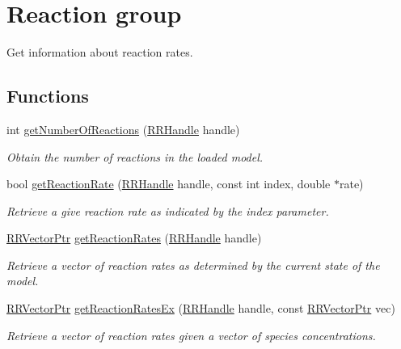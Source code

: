 \hypertarget{group__reaction}{\section{Reaction group}
\label{group__reaction}
}


Get information about reaction rates.  


\subsection*{Functions}
\begin{DoxyCompactItemize}
\item 
int \hyperlink{group__reaction_ga45a8bf0e5d7c9012222f0ad4c36e6731}{get\+Number\+Of\+Reactions} (\hyperlink{rrc__types_8h_a1d68f0592372208fa5a5f2799ea4b3ae}{R\+R\+Handle} handle)
\begin{DoxyCompactList}\small\item\em Obtain the number of reactions in the loaded model. \end{DoxyCompactList}\item 
bool \hyperlink{group__reaction_ga9e5d91c68214fd9642d3ffb9338cae19}{get\+Reaction\+Rate} (\hyperlink{rrc__types_8h_a1d68f0592372208fa5a5f2799ea4b3ae}{R\+R\+Handle} handle, const int index, double $\ast$rate)
\begin{DoxyCompactList}\small\item\em Retrieve a give reaction rate as indicated by the index parameter. \end{DoxyCompactList}\item 
\hyperlink{rrc__types_8h_a3be72d6006034fd349f753d2bf441bf7}{R\+R\+Vector\+Ptr} \hyperlink{group__reaction_gaa4b8c528a76898bbb78cfa41479dd085}{get\+Reaction\+Rates} (\hyperlink{rrc__types_8h_a1d68f0592372208fa5a5f2799ea4b3ae}{R\+R\+Handle} handle)
\begin{DoxyCompactList}\small\item\em Retrieve a vector of reaction rates as determined by the current state of the model. \end{DoxyCompactList}\item 
\hyperlink{rrc__types_8h_a3be72d6006034fd349f753d2bf441bf7}{R\+R\+Vector\+Ptr} \hyperlink{group__reaction_ga1dd7908ba77e177592587da9c21ed4f6}{get\+Reaction\+Rates\+Ex} (\hyperlink{rrc__types_8h_a1d68f0592372208fa5a5f2799ea4b3ae}{R\+R\+Handle} handle, const \hyperlink{rrc__types_8h_a3be72d6006034fd349f753d2bf441bf7}{R\+R\+Vector\+Ptr} vec)
\begin{DoxyCompactList}\small\item\em Retrieve a vector of reaction rates given a vector of species concentrations. \end{DoxyCompactList}\item 

\end{DoxyCompactItemize}
